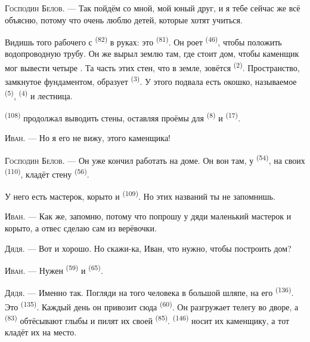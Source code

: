 \VUsaut{3.0mm}

\textsc{Господин Белов}. --- Так пойдём со мной, мой юный друг, и я тебе
сейчас же всё объясню, потому что очень люблю детей, которые хотят
учиться.

Видишь того рабочего с  \textsuperscript{(82)} в руках: это
 \textsuperscript{(81)}. Он роет  \textsuperscript{(46)},
чтобы положить водопроводную трубу. Он же вырыл землю там, где стоит дом,
чтобы каменщик мог вывести четыре . Та часть этих стен, что
в земле, зовётся  \textsuperscript{(2)}. Пространство,
замкнутое фундаментом, образует  \textsuperscript{(3)}. У этого
подвала есть окошко, называемое  \textsuperscript{(5)},
 \textsuperscript{(4)} и лестница.

 \textsuperscript{(108)} продолжал выводить стены, оставляя
проёмы для  \textsuperscript{(8)} и  \textsuperscript{(17)}.

\textsc{Иван}. --- Но я его не вижу, этого каменщика!

\textsc{Господин Белов}. --- Он уже кончил работать на доме. Он вон там,
у  \textsuperscript{(54)}, на своих 
\textsuperscript{(110)}, кладёт стену  \textsuperscript{(56)}.

У него есть мастерок, корыто и  \textsuperscript{(109)}. Но этих
названий ты не запомнишь.

\textsc{Иван}. --- Как же, запомню, потому что попрошу у дяди маленький
мастерок и корыто, а отвес сделаю сам из верёвочки.

\VUsaut{3.0mm}
\VUsaut{3.0mm}

\textsc{Дядя}. --- Вот и хорошо. Но скажи-ка, Иван, что нужно, чтобы
построить дом?

\textsc{Иван}. --- Нужен  \textsuperscript{(59)} и
 \textsuperscript{(65)}.

\textsc{Дядя}. --- Именно так. Погляди на того человека в большой шляпе,
на его  \textsuperscript{(136)}. Это 
\textsuperscript{(135)}. Каждый день он привозит сюда 
\textsuperscript{(60)}. Он разгружает телегу во дворе, а 
\textsuperscript{(83)} обтёсывают глыбы и пилят их своей 
\textsuperscript{(85)}.  \textsuperscript{(146)} носит их
каменщику, а тот кладёт их на место.

